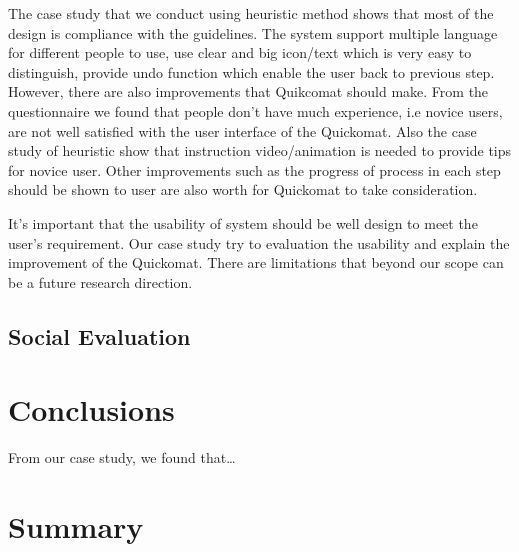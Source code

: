 \documentclass[twocolumn]{article}
\begin{document}
The case study that we conduct using heuristic method shows that most of the design is compliance with the guidelines. The system support multiple language for different people to use, use clear and big icon/text which is very easy to distinguish, provide undo function which enable the user back to previous step. However, there are also improvements that Quikcomat should make. From the questionnaire we found that people don’t have much experience, i.e novice users, are not well satisfied with the user interface of the Quickomat. Also the case study of heuristic show that instruction video/animation is needed to provide tips for novice user. Other improvements such as the progress of process in each step should be shown to user are also worth for Quickomat to take consideration.

It’s important that the usability of system should be well design to meet the user’s requirement. Our case study try to evaluation the usability and explain the improvement of the Quickomat. There are limitations that beyond our scope can be a future research direction.

\subsection{Social Evaluation}



\section{Conclusions}
From our case study, we found that…

\section{Summary}

\cite{*}


\end{document}
